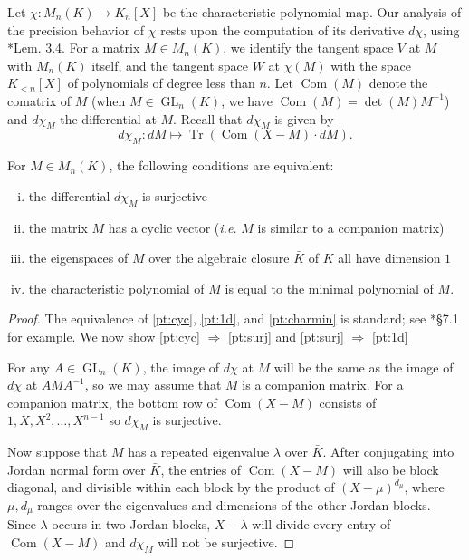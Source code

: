 \documentclass{sig-alternate-05-2015}
\DeclareMathOperator{\GL}{GL}
\DeclareMathOperator{\tr}{Tr}
\DeclareMathOperator{\com}{Com}
\begin{document}
Let $\chi : M_n(K) \to K_n[X]$ be the characteristic polynomial map.
Our analysis of the precision behavior of $\chi$ rests upon
the computation of its derivative $d\chi$, using \cite{caruso-roe-vaccon:14a}*{Lem. 3.4}.
For a matrix $M \in M_n(K)$, we identify the tangent space $V$
at $M$ with $M_n(K)$ itself, and the tangent space $W$ at $\chi(M)$ with
the space $K_{<n}[X]$ of polynomials of degree less than $n$.
Let $\com(M)$ denote the comatrix of $M$ (when $M \in \GL_n(K)$,
we have $\com(M) = \det(M) M^{-1}$) and $d\chi_M$ the differential at $M$.  Recall
that $d\chi_M$ is given by
\begin{equation} \label{eq:dchi}
d\chi_M: dM \mapsto \tr(\com(X-M) \cdot dM).
\end{equation}

\begin{prop}
\label{prop:surjectivity}
For $M \in M_n(K)$, the following conditions are equivalent:
\begin{enumerate}[(i)]
\renewcommand{\itemsep}{0pt}
\item \label{pt:surj} the differential $d\chi_M$ is surjective
\item \label{pt:cyc} the matrix $M$ has a cyclic vector (\emph{i.e.} $M$ is similar
to a companion matrix)
\item \label{pt:1d} the eigenspaces of $M$ over the algebraic
closure $\bar{K}$ of $K$ all have dimension $1$
\item \label{pt:charmin} the characteristic polynomial of $M$ is equal to the minimal polynomial of $M$.
\end{enumerate}
\end{prop}

\begin{proof}
The equivalence of \eqref{pt:cyc}, \eqref{pt:1d}, and \eqref{pt:charmin} is standard; see
\cite{hoffman-kunze:LinearAlgebra}*{\S 7.1} for example.  We now show
\eqref{pt:cyc} $\Rightarrow$ \eqref{pt:surj} and \eqref{pt:surj} $\Rightarrow$ \eqref{pt:1d}

For any $A \in \GL_n(K)$, the image of $d\chi$ at $M$ will be the same
as the image of $d\chi$ at $AMA^{-1}$, so we may assume that
$M$ is a companion matrix.  For a companion matrix, the bottom row of
$\com(X-M)$ consists of $1, X, X^2, \dots, X^{n-1}$ so $d\chi_M$ is surjective.

Now suppose that $M$ has a repeated eigenvalue $\lambda$ over $\bar{K}$.
After conjugating into Jordan normal form over $\bar{K}$, the entries of $\com(X-M)$
will also be block diagonal, and divisible within each block by the product of $(X-\mu)^{d_\mu}$,
where $\mu, d_\mu$ ranges over the eigenvalues and dimensions of the other Jordan blocks.
Since $\lambda$ occurs in two Jordan blocks,
$X - \lambda$ will divide every entry of $\com(X-M)$ and $d\chi_M$ will not be surjective.
\end{proof}
\end{document}
